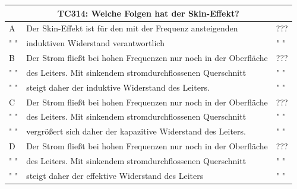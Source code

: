 \begin{frame}
	\begin{scriptsize}
	\begin{tabular}{|l|l|l|}
	\hline
		\multicolumn{3}{|c|}{\textbf{TC314:} Welche Folgen hat der Skin-Effekt?}\\
		\hline
		A & Der Skin-Effekt ist für den mit der Frequenz ansteigenden  & ??? \\
		" " & induktiven Widerstand verantwortlich  & " "\\ \hline
		
		B & Der Strom fließt bei hohen Frequenzen nur noch in der Oberfläche & ??? \\
		" " &des Leiters. Mit sinkendem stromdurchflossenen Querschnitt& " "\\
		" " & steigt daher der induktive Widerstand des Leiters.  & " "\\ \hline
		
		C & Der Strom fließt bei hohen Frequenzen nur noch in der Oberfläche& ??? \\
		" " & des  Leiters. Mit sinkendem stromdurchflossenen Querschnitt&" "\\
		" " & vergrößert  sich daher der kapazitive Widerstand des Leiters. &" "\\ \hline
		
		D &Der Strom fließt bei hohen Frequenzen nur noch in der Oberfläche& ??? \\
		" " & des Leiters. Mit sinkendem stromdurchflossenen Querschnitt& " "\\
		" " & steigt daher der effektive Widerstand des Leiters& " "\\ \hline
	\end{tabular}
	\end{scriptsize}
\end{frame}
